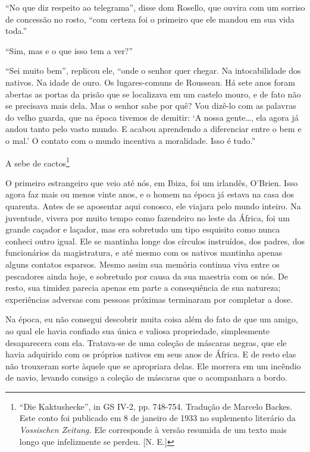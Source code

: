 ``No que diz respeito ao telegrama'', disse dom Rosello, que ouvira com
um sorriso de concessão no rosto, ``com certeza foi o primeiro que ele
mandou em sua vida toda.''

``Sim, mas e o que isso tem a ver?''

``Sei muito bem'', replicou ele, ``onde o senhor quer chegar. Na
intocabilidade dos nativos. Na idade de ouro. Os lugares-comuns de
Rousseau. Há sete anos foram abertas as portas da prisão que se
localizava em um castelo mouro, e de fato não se precisava mais dela.
Mas o senhor sabe por quê? Vou dizê-lo com as palavras do velho guarda,
que na época tivemos de demitir: `A nossa gente\ldots{}, ela agora já
andou tanto pelo vasto mundo. E acabou aprendendo a diferenciar entre o
bem e o mal.' O contato com o mundo incentiva a moralidade. Isso é
tudo.''

A sebe de cactos\footnote{``Die Kaktushecke'', in GS IV-2, pp. 748-754.
  Tradução de Marcelo Backes. Este conto foi publicado em 8 de janeiro
  de 1933 no suplemento literário da \emph{Vossischen Zeitung.} Ele
  corresponde à versão resumida de um texto mais longo que infelizmente
  se perdeu. {[}N. E.{]}}

O primeiro estrangeiro que veio até nós, em Ibiza, foi um irlandês,
O'Brien. Isso agora faz mais ou menos vinte anos, e o homem na época já
estava na casa dos quarenta. Antes de se aposentar aqui conosco, ele
viajara pelo mundo inteiro. Na juventude, vivera por muito tempo como
fazendeiro no leste da África, foi um grande caçador e laçador, mas era
sobretudo um tipo esquisito como nunca conheci outro igual. Ele se
mantinha longe dos círculos instruídos, dos padres, dos funcionários da
magistratura, e até mesmo com os nativos mantinha apenas alguns contatos
esparsos. Mesmo assim sua memória continua viva entre os pescadores
ainda hoje, e sobretudo por causa da sua maestria com os nós. De resto,
sua timidez parecia apenas em parte a consequência de sua natureza;
experiências adversas com pessoas próximas terminaram por completar a
dose.

Na época, eu não consegui descobrir muita coisa além do fato de que um
amigo, ao qual ele havia confiado sua única e valiosa propriedade,
simplesmente desaparecera com ela. Tratava-se de uma coleção de máscaras
negras, que ele havia adquirido com os próprios nativos em seus anos de
África. E de resto elas não trouxeram sorte àquele que se apropriara
delas. Ele morrera em um incêndio de navio, levando consigo a coleção de
máscaras que o acompanhara a bordo.

